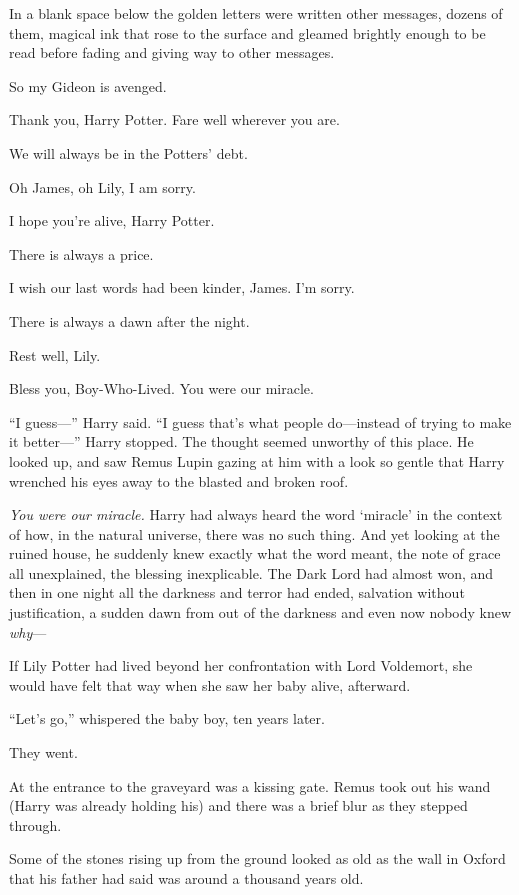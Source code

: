 In a blank space below the golden letters were written other messages, dozens
of them, magical ink that rose to the surface and gleamed brightly enough to be
read before fading and giving way to other messages.

\begin{center}
So my Gideon is avenged.

Thank you, Harry Potter. Fare well wherever you are.

We will always be in the Potters’ debt.

Oh James, oh Lily, I am sorry.

I hope you’re alive, Harry Potter.

There is always a price.

I wish our last words had been kinder, James. I’m sorry.

There is always a dawn after the night.

Rest well, Lily.

Bless you, Boy-Who-Lived. You were our miracle.
\end{center}

“I guess—” Harry said. “I guess that’s what people do—instead of trying to
make it better—” Harry stopped. The thought seemed unworthy of this place. He
looked up, and saw Remus Lupin gazing at him with a look so gentle that Harry
wrenched his eyes away to the blasted and broken roof.

\emph{You were our miracle.} Harry had always heard the word ‘miracle’ in the
context of how, in the natural universe, there was no such thing. And yet
looking at the ruined house, he suddenly knew exactly what the word meant, the
note of grace all unexplained, the blessing inexplicable. The Dark Lord had
almost won, and then in one night all the darkness and terror had ended,
salvation without justification, a sudden dawn from out of the darkness and
even now nobody knew \emph{why}—

If Lily Potter had lived beyond her confrontation with Lord Voldemort, she
would have felt that way when she saw her baby alive, afterward.

“Let’s go,” whispered the baby boy, ten years later.

They went.

At  the entrance to the graveyard was a kissing gate.
Remus took out his wand (Harry was already
holding his) and there was a brief blur as they stepped through.

Some of the stones rising up from the ground looked as old as the wall in
Oxford that his father had said was around a thousand years old.

